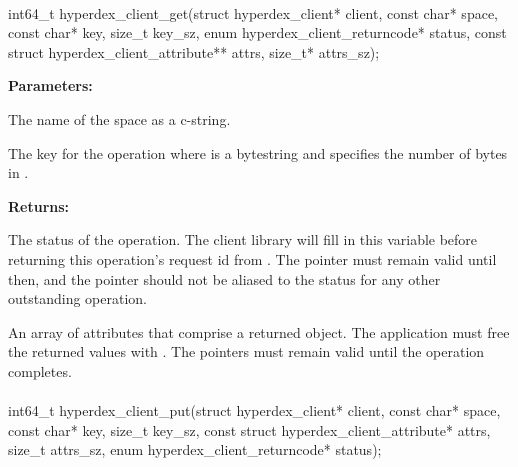 
\paragraph{}
\label{api:c:get}
\begin{ccode}
int64_t hyperdex_client_get(struct hyperdex_client* client,
                const char* space,
                const char* key, size_t key_sz,
                enum hyperdex_client_returncode* status,
                const struct hyperdex_client_attribute** attrs, size_t* attrs_sz);
\end{ccode}
\funcdesc 

\noindent\textbf{Parameters:}
\begin{description}[labelindent=\widthof{{\code{key}, \code{key\_sz}}},leftmargin=*,noitemsep,nolistsep,align=right]
\item[\code{space}] The name of the space as a c-string.
\item[\code{key}, \code{key\_sz}] The key for the operation where  is a bytestring and  specifies the number of bytes in .
\end{description}

\noindent\textbf{Returns:}
\begin{description}[labelindent=\widthof{{\code{attrs}, \code{attrs\_sz}}},leftmargin=*,noitemsep,nolistsep,align=right]
\item[\code{status}] The status of the operation.  The client library will fill in this variable before returning this operation's request id from .  The pointer must remain valid until then, and the pointer should not be aliased to the status for any other outstanding operation.
\item[\code{attrs}, \code{attrs\_sz}] An array of attributes that comprise a returned object.  The application must free the returned values with .  The pointers must remain valid until the operation completes.
\end{description}

\paragraph{}
\label{api:c:put}
\begin{ccode}
int64_t hyperdex_client_put(struct hyperdex_client* client,
                const char* space,
                const char* key, size_t key_sz,
                const struct hyperdex_client_attribute* attrs, size_t attrs_sz,
                enum hyperdex_client_returncode* status);
\end{ccode}
\funcdesc 

